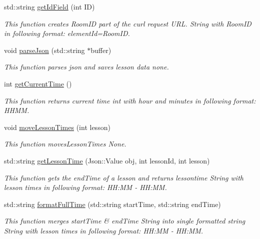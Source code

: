\begin{DoxyCompactItemize}
std\+::string \hyperlink{classCurlHandler_a26d8a6f384d54fd7af70fde33232531a}{get\+Id\+Field} (int ID)
\begin{DoxyCompactList}\small\item\em This function creates Room\+ID part of the curl request U\+RL.  String with Room\+ID in following format\+: element\+Id=Room\+ID. \end{DoxyCompactList}\item 
void \hyperlink{classCurlHandler_a2e63afaaf3fd64263505f90821f02d05}{parse\+Json} (std\+::string $\ast$buffer)
\begin{DoxyCompactList}\small\item\em This function parses json and saves lesson data  none. \end{DoxyCompactList}\item 
int \hyperlink{classCurlHandler_a54e7bc698682a0b313b3de0f6d2c7cf4}{get\+Current\+Time} ()
\begin{DoxyCompactList}\small\item\em This function returns current time  int with hour and minutes in following format\+: H\+H\+MM. \end{DoxyCompactList}\item 
void \hyperlink{classCurlHandler_af6808f78b075e81747be9ff5c19a8b61}{move\+Lesson\+Times} (int lesson)
\begin{DoxyCompactList}\small\item\em This function moves\+Lesson\+Times  None. \end{DoxyCompactList}\item 
std\+::string \hyperlink{classCurlHandler_aa62b036298bc0ca7365cb32919996a54}{get\+Lesson\+Time} (Json\+::\+Value obj, int lesson\+Id, int lesson)
\begin{DoxyCompactList}\small\item\em This function gets the end\+Time of a lesson and returns lessontime  String with lesson times in following format\+: HH\+:MM -\/ HH\+:MM. \end{DoxyCompactList}\item 
std\+::string \hyperlink{classCurlHandler_ae208efd8422979786ee921c5148b17c7}{format\+Full\+Time} (std\+::string start\+Time, std\+::string end\+Time)
\begin{DoxyCompactList}\small\item\em This function merges start\+Time \& end\+Time String into single formatted string  String with lesson times in following format\+: HH\+:MM -\/ HH\+:MM. \end{DoxyCompactList}\item 

\end{DoxyCompactItemize}
